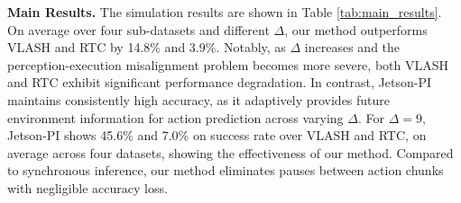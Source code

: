 \textbf{Main Results.} 
The simulation results are shown in Table \ref{tab:main_results}. On average over four sub-datasets and different $\Delta$, our method outperforms VLASH and RTC by 14.8\% and 3.9\%. 
Notably, as $\Delta$ increases and the perception-execution misalignment problem becomes more severe, both VLASH and RTC exhibit significant performance degradation.
In contrast, Jetson-PI maintains consistently high accuracy, as it adaptively provides future environment information for action prediction across varying $\Delta$.
For $\Delta=9$, Jetson-PI shows 45.6\% and 7.0\% on success rate over VLASH and RTC, on average across four datasets, showing the effectiveness of our method.
Compared to synchronous inference, our method eliminates pauses between action chunks with negligible accuracy loss.







